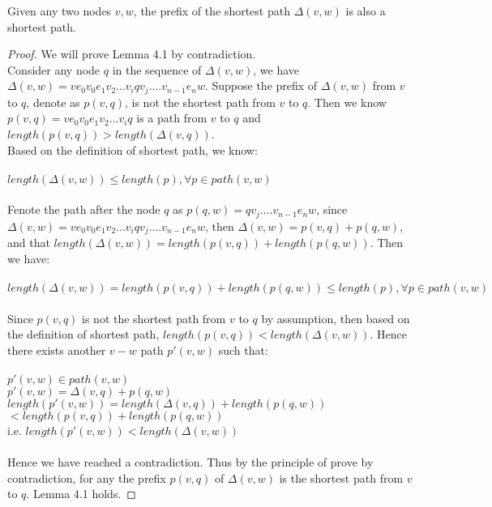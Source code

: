 \begin{sublemma} \label{lemma4.1}
Given any two nodes $v, w$, the prefix of the shortest path $\Delta(v, w)$ is also a shortest path. 
\end{sublemma}
\begin{proof}
We will prove Lemma 4.1 by contradiction. 
\\
Consider any node $q$ in the sequence of $\Delta(v, w)$, we have $\Delta(v, w) = ve_0v_0e_1v_2...v_i q v_j....v_{n-1}e_nw$. Suppose the prefix of $\Delta(v, w)$ from $v$ to $q$, denote as $p(v, q)$, is not the shortest path from $v$ to $q$. Then we know $p(v, q) = ve_0v_0e_1v_2...v_iq$ is a path from $v$ to $q$ and $length(p(v, q)) > length(\Delta(v, q))$. 
\\
Based on the definition of shortest path, we know: 
\\\\
\ftab $length(\Delta(v, w)) \leq length(p), \forall  p \in path(v, w)$
\\\\
Fenote the path after the node $q$ as $p(q, w) = q v_j....v_{n-1}e_nw$, since $\Delta(v, w) = ve_0v_0e_1v_2...v_i q v_j....v_{n-1}e_nw$, then $\Delta(v, w) = p(v, q) + p(q, w)$, and that $length(\Delta(v, w)) = length(p(v, q)) + length(p(q, w))$. Then we have: 
\\\\
\tab$length(\Delta(v, w)) = length(p(v, q)) + length(p(q, w)) \leq length(p), \forall p \in path(v, w)$
\\\\
Since $p(v, q)$ is not the shortest path from $v$ to $q$ by assumption, then based on the definition of shortest path, $length(p(v, q)) < length(\Delta(v, w))$. Hence there exists another $v-w$ path $p'(v, w)$ such that: 
\\\\
\ftab $p'(v, w) \in path(v, w)$\\
\ftab $p'(v, w) = \Delta(v, q) + p(q, w)$ \\ 
\ftab $length(p'(v, w)) = length(\Delta(v, q)) + length(p(q, w))$ \\ 
\ftab\tab\tab\htab\tsp$< length(p(v, q)) + length(p(q, w))$ \\
\ftab i.e. $length(p'(v, w)) < length(\Delta(v, w))$
\\\\
Hence we have reached a contradiction. Thus by the principle of prove by contradiction, for any the prefix $p(v, q)$ of $\Delta(v, w)$ is the shortest path from $v$ to $q$. Lemma 4.1 holds. 
\end{proof}
\tab \\